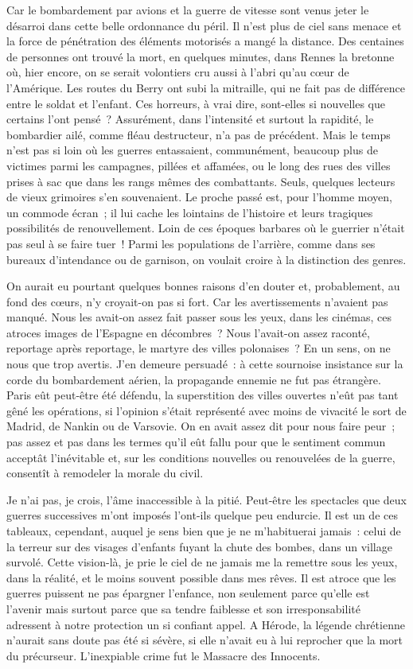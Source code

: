 \documentclass[french,twoside]{book} %
\begin{document}
Car le bombardement par avions et la guerre de vitesse sont venus jeter le désarroi dans cette belle ordonnance du péril. Il n’est plus de ciel sans menace et la force de pénétration des éléments motorisés a mangé la distance. Des centaines de personnes ont trouvé la mort, en quelques minutes, dans Rennes la bretonne où, hier encore, on se serait volontiers cru aussi à l’abri qu’au cœur de l’Amérique. Les routes du Berry ont subi la mitraille, qui ne fait pas de différence entre le soldat et l’enfant. Ces horreurs, à vrai dire, sont-elles si nouvelles que certains l’ont pensé ? Assurément, dans l’intensité et surtout la rapidité, le bombardier ailé, comme fléau destructeur, n’a pas de précédent. Mais le temps n’est pas si loin où les guerres entassaient, communément, beaucoup plus de victimes parmi les campagnes, pillées et affamées, ou le long des rues des villes prises à sac que dans les rangs mêmes des combattants. Seuls, quelques lecteurs de vieux   grimoires s’en souvenaient. Le proche passé est, pour l’homme moyen, un commode écran ; il lui cache les lointains de l’histoire et leurs tragiques possibilités de renouvellement. Loin de ces époques barbares où le guerrier n’était pas seul à se faire tuer ! Parmi les populations de l’arrière, comme dans ses bureaux d’intendance ou de garnison, on voulait croire à la distinction des genres.\par
On aurait eu pourtant quelques bonnes raisons d’en douter et, probablement, au fond des cœurs, n’y croyait-on pas si fort. Car les avertissements n’avaient pas manqué. Nous les avait-on assez fait passer sous les yeux, dans les cinémas, ces atroces images de l’Espagne en décombres ? Nous l’avait-on assez raconté, reportage après reportage, le martyre des villes polonaises ? En un sens, on ne nous que trop avertis. J’en demeure persuadé : à cette sournoise insistance sur la corde du bombardement aérien, la propagande ennemie ne fut pas étrangère. Paris eût peut-être été défendu, la superstition des villes ouvertes n’eût pas tant gêné les opérations, si l’opinion s’était représenté avec moins de vivacité le sort de Madrid, de Nankin ou de Varsovie. On en avait assez dit pour nous faire peur ; pas assez et pas dans les termes qu’il eût fallu pour que le sentiment commun acceptât l’inévitable et, sur les conditions nouvelles ou renouvelées de la guerre, consentît à remodeler la morale du civil.\par
Je n’ai pas, je crois, l’âme inaccessible à la pitié. Peut-être les spectacles que deux guerres successives m’ont imposés l’ont-ils quelque peu endurcie. Il est un de ces tableaux, cependant, auquel je sens bien que je ne m’habituerai jamais : celui de la terreur sur des visages d’enfants fuyant la chute des bombes, dans un village survolé. Cette vision-là, je prie le ciel de ne jamais me la remettre sous les yeux, dans la réalité, et le moins souvent possible dans mes rêves. Il est atroce que les guerres puissent ne pas épargner l’enfance, non seulement   parce qu’elle est l’avenir mais surtout parce que sa tendre faiblesse et son irresponsabilité adressent à notre protection un si confiant appel. A Hérode, la légende chrétienne n’aurait sans doute pas été si sévère, si elle n’avait eu à lui reprocher que la mort du précurseur. L’inexpiable crime fut le Massacre des Innocents.\par
\end{document}
